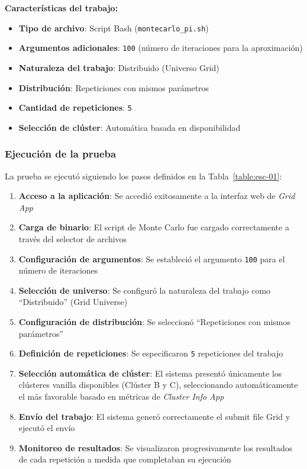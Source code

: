 \textbf{Características del trabajo:}
\begin{itemize}
	\item \textbf{Tipo de archivo}: Script Bash (\texttt{montecarlo\_pi.sh})
	\item \textbf{Argumentos adicionales}: \texttt{100} (número de iteraciones para la aproximación)
	\item \textbf{Naturaleza del trabajo}: Distribuido (Universo Grid)
	\item \textbf{Distribución}: Repeticiones con mismos parámetros
	\item \textbf{Cantidad de repeticiones}: \texttt{5}
	\item \textbf{Selección de clúster}: Automática basada en disponibilidad
\end{itemize}

\subsubsection{Ejecución de la prueba}
\noindent

La prueba se ejecutó siguiendo los pasos definidos en la Tabla~\ref{table:esc-01}:

\begin{enumerate}
	\item \textbf{Acceso a la aplicación}: Se accedió exitosamente a la interfaz web de \textit{Grid App}
	
	\item \textbf{Carga de binario}: El script de Monte Carlo fue cargado correctamente a través del selector de archivos
	
	\item \textbf{Configuración de argumentos}: Se estableció el argumento \texttt{100} para el número de iteraciones
	
	\item \textbf{Selección de universo}: Se configuró la naturaleza del trabajo como ``Distribuido'' (Grid Universe)
	
	\item \textbf{Configuración de distribución}: Se seleccionó ``Repeticiones con mismos parámetros''
	
	\item \textbf{Definición de repeticiones}: Se especificaron \texttt{5} repeticiones del trabajo
	
	\item \textbf{Selección automática de clúster}: El sistema presentó únicamente los clústeres vanilla disponibles (Clúster B y C), seleccionando automáticamente el más favorable basado en métricas de \textit{Cluster Info App}
	
	\item \textbf{Envío del trabajo}: El sistema generó correctamente el submit file Grid y ejecutó el envío
	
	\item \textbf{Monitoreo de resultados}: Se visualizaron progresivamente los resultados de cada repetición a medida que completaban su ejecución
\end{enumerate}

